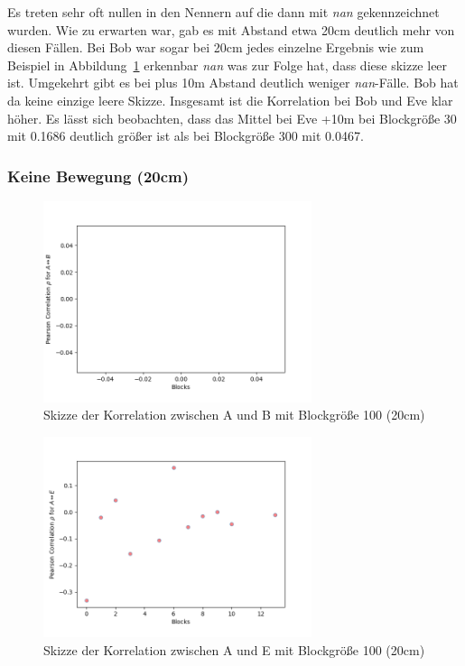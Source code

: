 \documentclass[12pt,a4paper]{article}
\begin{document}
Es treten sehr oft nullen in den Nennern auf die dann mit 
\textit{nan} gekennzeichnet wurden. Wie zu erwarten war, gab 
es mit Abstand etwa 20cm deutlich mehr von diesen Fällen. 
Bei Bob war sogar bei 20cm jedes einzelne Ergebnis wie 
zum Beispiel in Abbildung~\ref{fig:Label8} erkennbar \textit{nan}
was zur Folge hat, dass diese skizze leer ist. 
Umgekehrt gibt es bei plus 10m Abstand deutlich weniger
\textit{nan}-Fälle. Bob hat da keine einzige leere Skizze.
Insgesamt ist die Korrelation bei Bob und Eve klar höher.
Es lässt sich beobachten, dass das Mittel bei Eve +10m bei Blockgröße
30 mit 0.1686 deutlich größer ist als bei Blockgröße 300 mit 0.0467.

\newpage
\subsubsection*{Keine Bewegung (20cm)}


\begin{figure}[hbt!]
	\centering
		\includegraphics[width=0.7\textwidth ]
		{Bilder/a3-t3a-ob-block100-correlation-AB.png}
		\caption{Skizze der Korrelation zwischen A und B mit Blockgröße 100 (20cm)}
		\label{fig:Label8}
\end{figure}

\begin{figure}[hbt!]
	\centering
		\includegraphics[width=0.7\textwidth ]
		{Bilder/a3-t3a-ob-block100-correlation-AE.png}
		\caption{Skizze der Korrelation zwischen A und E mit Blockgröße 100 (20cm)}
		\label{fig:Label9}
\end{figure}
\clearpage
\end{document}

